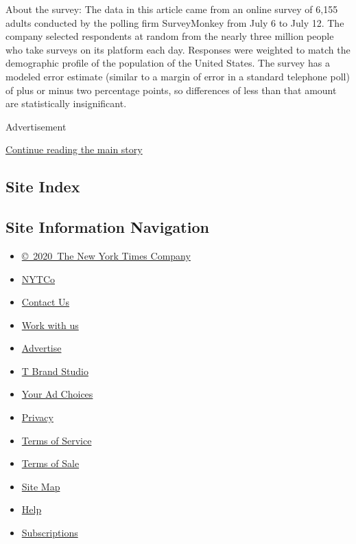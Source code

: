 About the survey: The data in this article came from an online survey of
6,155 adults conducted by the polling firm SurveyMonkey from July 6 to
July 12. The company selected respondents at random from the nearly
three million people who take surveys on its platform each day.
Responses were weighted to match the demographic profile of the
population of the United States. The survey has a modeled error estimate
(similar to a margin of error in a standard telephone poll) of plus or
minus two percentage points, so differences of less than that amount are
statistically insignificant.

Advertisement

\protect\hyperlink{after-bottom}{Continue reading the main story}

\hypertarget{site-index}{%
\subsection{Site Index}\label{site-index}}

\hypertarget{site-information-navigation}{%
\subsection{Site Information
Navigation}\label{site-information-navigation}}

\begin{itemize}
\tightlist
\item
  \href{https://help.nytimes3xbfgragh.onion/hc/en-us/articles/115014792127-Copyright-notice}{©~2020~The
  New York Times Company}
\end{itemize}

\begin{itemize}
\tightlist
\item
  \href{https://www.nytco.com/}{NYTCo}
\item
  \href{https://help.nytimes3xbfgragh.onion/hc/en-us/articles/115015385887-Contact-Us}{Contact
  Us}
\item
  \href{https://www.nytco.com/careers/}{Work with us}
\item
  \href{https://nytmediakit.com/}{Advertise}
\item
  \href{http://www.tbrandstudio.com/}{T Brand Studio}
\item
  \href{https://www.nytimes3xbfgragh.onion/privacy/cookie-policy\#how-do-i-manage-trackers}{Your
  Ad Choices}
\item
  \href{https://www.nytimes3xbfgragh.onion/privacy}{Privacy}
\item
  \href{https://help.nytimes3xbfgragh.onion/hc/en-us/articles/115014893428-Terms-of-service}{Terms
  of Service}
\item
  \href{https://help.nytimes3xbfgragh.onion/hc/en-us/articles/115014893968-Terms-of-sale}{Terms
  of Sale}
\item
  \href{https://spiderbites.nytimes3xbfgragh.onion}{Site Map}
\item
  \href{https://help.nytimes3xbfgragh.onion/hc/en-us}{Help}
\item
  \href{https://www.nytimes3xbfgragh.onion/subscription?campaignId=37WXW}{Subscriptions}
\end{itemize}
